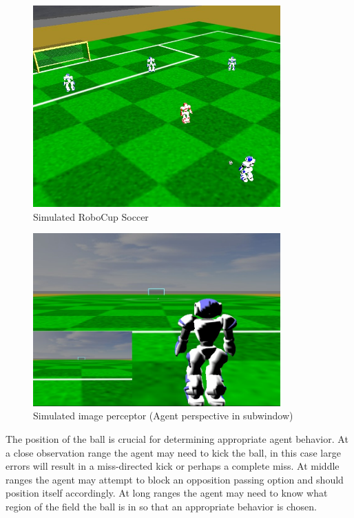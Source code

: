 \documentclass[a4paper,twoside,12pt]{report}
\begin{document}
\begin{figure}[h!]
\begin{center}
\includegraphics[width=9.5cm]{images/Robocup1.jpg}
\caption{Simulated RoboCup Soccer}
\label{fig:robofb}
\end{center}
\end{figure}

\begin{figure}[h!]
\begin{center}
\includegraphics[width=9.5cm]{images/Robocup2.jpg}
\caption{Simulated image perceptor (Agent perspective in subwindow)}
\label{fig:agentview}
\end{center}
\end{figure}

The position of the ball is crucial for determining appropriate agent behavior. At a close observation range the agent may need to kick the ball, in this case large errors will result in a miss-directed kick or perhaps a complete miss. At middle ranges the agent may attempt to block an opposition passing option and should position itself accordingly. At long ranges the agent may need to know what region of the field the ball is in so that an appropriate behavior is chosen. 
\end{document}
